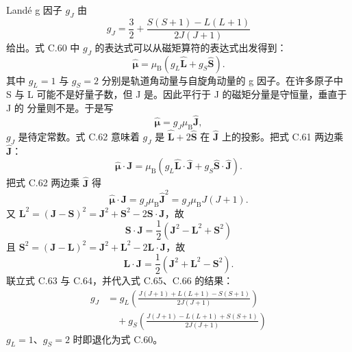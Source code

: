 Landé g 因子 $g_J$ 由
\begin{equation*}
g_J = \frac{3}{2} + \frac{S(S+1)-L(L+1)}{2J(J+1)}\tag{C.60}
\end{equation*}
给出。式 C.60 中 $g_J$ 的表达式可以从磁矩算符的表达式出发得到：
\begin{equation*}
\hat{\boldsymbol{\mu}} = \mu_{\mathrm{B}}(g_L\hat{\mathbf{L}} + g_S\hat{\mathbf{S}}).\tag{C.61}
\end{equation*}
其中 $g_L=1$ 与 $g_S=2$ 分别是轨道角动量与自旋角动量的 g 因子。在许多原子中 S
与 L 可能不是好量子数，但 J 是。因此平行于 J 的磁矩分量是守恒量，垂直于 J 的
分量则不是。于是写
\begin{equation*}
\hat{\boldsymbol{\mu}} = g_J\mu_{\mathrm{B}}\hat{\mathbf{J}},\tag{C.62}
\end{equation*}
$g_J$ 是待定常数。式 C.62 意味着 $g_J$ 是 $\hat{\mathbf{L}}+2\hat{\mathbf{S}}$
在 $\hat{\mathbf{J}}$ 上的投影。把式 C.61 两边乘 $\hat{\mathbf{J}}$：
\begin{equation*}
\hat{\boldsymbol{\mu}}\cdot\mathbf{J} = \mu_{\mathrm{B}}(g_L\hat{\mathbf{L}}\cdot\hat{\mathbf{J}} + g_S\hat{\mathbf{S}}\cdot\hat{\mathbf{J}}).\tag{C.63}
\end{equation*}
把式 C.62 两边乘 $\hat{\mathbf{J}}$ 得
\begin{equation*}
\hat{\boldsymbol{\mu}}\cdot\mathbf{J} = g_J\mu_{\mathrm{B}}\hat{\mathbf{J}}^{2} = g_J\mu_{\mathrm{B}}J(J+1).\tag{C.64}
\end{equation*}
又 $\mathbf{L}^{2}=(\mathbf{J}-\mathbf{S})^{2}=\mathbf{J}^{2}+\mathbf{S}^{2}-2\mathbf{S}\cdot\mathbf{J}$，故
\begin{equation*}
\mathbf{S}\cdot\mathbf{J} = \frac{1}{2}(\mathbf{J}^{2}-\mathbf{L}^{2}+\mathbf{S}^{2})\tag{C.65}
\end{equation*}
且 $\mathbf{S}^{2}=(\mathbf{J}-\mathbf{L})^{2}=\mathbf{J}^{2}+\mathbf{L}^{2}-2\mathbf{L}\cdot\mathbf{J}$，故
\begin{equation*}
\mathbf{L}\cdot\mathbf{J} = \frac{1}{2}(\mathbf{J}^{2}+\mathbf{L}^{2}-\mathbf{S}^{2}).\tag{C.66}
\end{equation*}
联立式 C.63 与 C.64，并代入式 C.65、C.66 的结果：
\begin{equation*}
\begin{aligned}
g_J &= g_L\left(\frac{J(J+1)+L(L+1)-S(S+1)}{2J(J+1)}\right)\\
&\quad + g_S\left(\frac{J(J+1)-L(L+1)+S(S+1)}{2J(J+1)}\right)
\end{aligned}\tag{C.67}
\end{equation*}
$g_L=1$、$g_S=2$ 时即退化为式 C.60。

